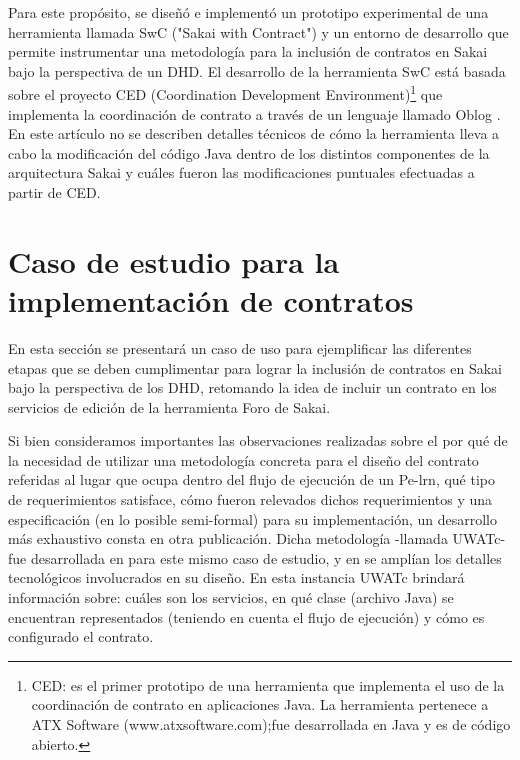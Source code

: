 Para este propósito, se diseñó e implementó un prototipo experimental de una
herramienta llamada SwC ("Sakai with Contract") y un entorno de desarrollo que
permite instrumentar una metodología \cite{cacic,edutec} para la inclusión de
contratos en Sakai bajo la perspectiva de un DHD. El desarrollo de la
herramienta SwC está basada sobre el proyecto CED (Coordination Development
Environment)\footnote{CED: es el primer prototipo de una herramienta que
implementa el uso de la coordinación de contrato en aplicaciones Java. La
herramienta pertenece a ATX Software (www.atxsoftware.com);fue desarrollada
en Java y es de código abierto.} que implementa la coordinación de contrato a
través de un lenguaje llamado Oblog \cite{lenguajeoblog}. En este artículo no se
describen detalles técnicos de cómo la herramienta lleva a cabo la modificación
del código Java dentro de los distintos componentes de la arquitectura Sakai y
cuáles fueron las modificaciones puntuales efectuadas a partir de CED. 



\section {Caso de estudio para la implementación de contratos} \label{caso de estudio}

En esta sección se presentará un caso de uso para ejemplificar las diferentes
etapas que se deben cumplimentar para lograr la inclusión de contratos en Sakai
bajo la perspectiva de los DHD, retomando la idea de incluir un contrato en los
servicios de edición de la herramienta Foro de Sakai.

Si bien consideramos importantes las observaciones realizadas sobre el por qué
de la necesidad de utilizar una metodología concreta para el diseño del contrato
referidas al lugar que ocupa dentro del flujo de ejecución de un Pe-lrn, qué
tipo de requerimientos satisface, cómo fueron relevados dichos requerimientos y
una especificación (en lo posible semi-formal) para su implementación, un
desarrollo más exhaustivo consta en otra publicación. Dicha metodología -llamada
UWATc- fue desarrollada en \cite{edutec}  para este mismo caso de estudio, y en
\cite{cacic} se amplían los detalles tecnológicos involucrados en su diseño. En
esta instancia UWATc brindará información sobre: cuáles son los servicios, en
qué clase (archivo Java) se encuentran representados (teniendo en cuenta el
flujo de ejecución) y cómo es configurado el contrato.

